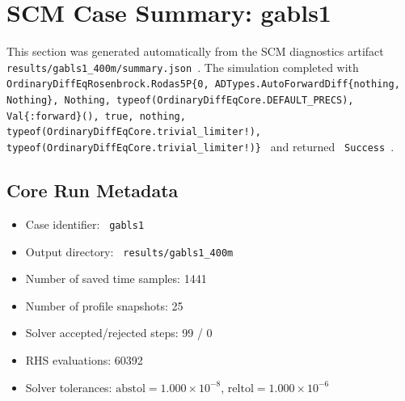 \section{SCM Case Summary: gabls1}
\label{sec:scm_case_gabls1_400m_gabls1_200x2m_12h_report}

This section was generated automatically from the SCM diagnostics artifact
\texttt{ results/gabls1\_400m/summary.json }. The simulation completed with \texttt{ OrdinaryDiffEqRosenbrock.Rodas5P\{0, ADTypes.AutoForwardDiff\{nothing, Nothing\}, Nothing, typeof(OrdinaryDiffEqCore.DEFAULT\_PRECS), Val\{:forward\}(), true, nothing, typeof(OrdinaryDiffEqCore.trivial\_limiter!), typeof(OrdinaryDiffEqCore.trivial\_limiter!)\} }
and returned \texttt{ Success }.

\subsection{Core Run Metadata}
\begin{itemize}
  \item Case identifier: \texttt{ gabls1 }
  \item Output directory: \texttt{ results/gabls1\_400m }
  \item Number of saved time samples: 1441
  \item Number of profile snapshots: 25
  \item Solver accepted/rejected steps: 99 / 0
  \item RHS evaluations: 60392
  \item Solver tolerances: $\mathrm{abstol}=1.000 \times 10^{-8}$, $\mathrm{reltol}=1.000 \times 10^{-6}$
\end{itemize}

